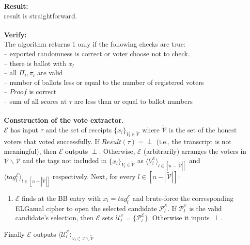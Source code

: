 \documentclass[12pt]{article}
\begin{document}
\textbf{Result:} \\
result is straightforward.\\\\
\textbf{Verify:} \\
The algorithm returns 1 only if the following checks are true:\\
--  exported randomness is correct or voter choose not to check.\\
-- there is ballot with $x_l$\\
-- all $\Pi_l, \pi_l$ are valid\\
-- number of ballots less or equal to the number of registered voters\\
-- $Proof$ is correct\\
-- sum of all scores at $\tau$ are less than or equal to ballot numbers\\\\
\textbf{Construction of the vote extractor.}\\ 
$\mathcal{E}$ has input $\tau$ and the set of receipts  $\{x_l\}_{V_l \in \tilde{\mathcal{V}}}$ where $\tilde{\mathcal{V}}$ is the set of the honest voters that voted successfully.  If $Result(\tau) = \perp$ (i.e., the transcript is not meaningful), then $\mathcal{E}$ outputs $\perp$. Otherwise, $\mathcal{E}$ (arbitrarily) arranges the voters in $\mathcal{V} \backslash \tilde{\mathcal{V}}$ and the tags not included in $\{x_l\}_{V_l \in \tilde{\mathcal{V}}}$ as $\langle V_l^{\mathcal{E}} \rangle_{l \in  [n - |\tilde{\mathcal{V}}|]}$ and $\langle tag_l^{\mathcal{E}} \rangle_{l \in  [n - |\tilde{\mathcal{V}}|]}$ respectively. Next, for every $l \in [n - |\tilde{\mathcal{V}}|]$:\\
\begin{enumerate}
\item  $\mathcal{E}$ finds at the BB entry with   $x_l = tag_l^{\mathcal{E}}$ and brute-force the corresponding ELGamal cipher to open the selected candidate $\mathcal{P}_l^{\mathcal{E}}$. If $\mathcal{P}_l^{\mathcal{E}}$ is the valid candidate's selection, then $\mathcal{E}$ sets $\mathcal{U}_l^{\mathcal{E}} = \{\mathcal{P}_l^{\mathcal{E}}\}$. Otherwise it inputs $\perp$.
\end{enumerate}
Finally $\mathcal{E}$ outputs  $\langle \mathcal{U}_l^{\mathcal{E}} \rangle_{V_l \in \mathcal{V} \backslash \tilde{\mathcal{V}}  }$
\end{document}
